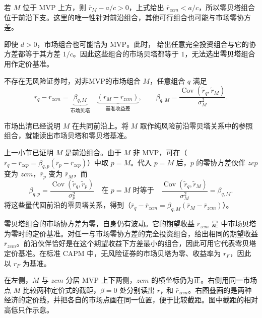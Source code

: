 若 $M$ 位于 MVP 上方，则 $\bar r_M-a/c>0$，上式给出 $\bar r_{zcm}<a/c$，所以零贝塔组合位于前沿下支。这里的唯一性针对前沿组合，其他可行组合也可能与市场零协方差。

即使 $d>0$，市场组合也可能恰为 MVP。此时， 给出任意完全投资组合与它的协方差都等于其方差 $1/c$。因此这些组合的市场贝塔都等于 $1$，无法选出零贝塔组合用作定价基准。

\begin{tcolorbox}[knowledge]
 不存在无风险证券时，对非MVP的市场组合 $M$，任意组合 $q$ 满足
\begin{equation}
 \bar r_q-\bar r_{zcm}
 =\underbrace{\beta_{q,M}}_{\text{市场贝塔}}\quad
  \underbrace{(\bar r_M-\bar r_{zcm})}_{\text{基准收益差}},\qquad
 \beta_{q,M}=\frac{\operatorname{Cov}(\widetilde r_q,\widetilde r_M)}{\sigma_M^2}.
 \label{eq:wj-13-5}
\end{equation}
\end{tcolorbox}

市场出清已经说明 $M$ 在共同前沿上。将 $M$ 取作纯风险前沿零贝塔关系中的参照组合，就能读出市场贝塔和零贝塔基准。

\begin{solution}[label-content={证明},blank-type=none]
上一小节已证明 $M$ 是前沿组合。由于 $M$ 非 MVP，可在（$\bar r_q-\bar r_{zcp}=\beta_{q,p}(\bar r_p-\bar r_{zcp})$）中取 $p=M$。代入 $p=M$ 后，$p$ 的零协方差伙伴 $zcp$ 变为 $zcm$，$\bar r_p$ 变为 $\bar r_M$，而
\[
 \beta_{q,p}=\frac{\operatorname{Cov}(\widetilde r_q,\widetilde r_p)}{\sigma_p^2}
 \quad\text{在 }p=M\text{ 时等于}\quad
 \frac{\operatorname{Cov}(\widetilde r_q,\widetilde r_M)}{\sigma_M^2}=\beta_{q,M}.
\]
将这些量代回前沿的零贝塔关系，得到（$\bar r_q-\bar r_{zcm}=\beta_{q,M}(\bar r_M-\bar r_{zcm})$）。
\end{solution}

零贝塔组合的市场协方差为零，自身仍有波动。它的期望收益 $\bar r_{zcm}$ 是 中市场贝塔为零时的定价基准。对任一与市场零协方差的完全投资组合，给出相同的期望收益 $\bar r_{zcm}$。前沿伙伴恰好是在这个期望收益下方差最小的组合，因此可用它代表零贝塔定价基准。在标准 CAPM 中，无风险证券的市场贝塔为零、收益率为 $r_F$，因此 以 $r_F$ 为基准。

在左侧，$M$ 与 $zcm$ 分居 MVP 上下两侧，$zcm$ 的横坐标仍为正。右侧用同一市场点 $M$ 比较两种定价式的截距，$\beta=0$ 处分别读出 $r_F$ 和 $\bar r_{zcm}$。右图叠画的是两种经济的定价线，并把各自的市场点画在同一位置，便于比较截距。图中截距的相对高低只作示意。

